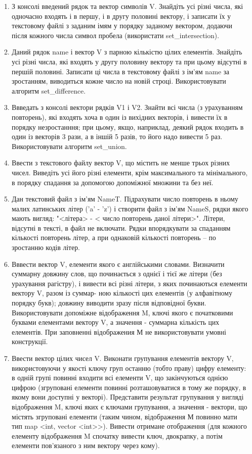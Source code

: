 \documentclass[a5paper,titlepage,openany,twoside,draft]{book_unv}%
\begin{document}
\begin{enumerate}
\item
З консолі введений рядок та вектор символів V. 
Знайдіть усі різні числа, які одночасно входять
і в першу, і в другу половині вектору, і записати їх 
у текстовому файлі з заданим імям у порядку заданому вектором, додаючи
після кожного числа символ пробела (використати set\_intersection).
\item
Даний рядок name і вектор V з парною кількістю цілих елементів.
 Знайдіть усі різні числа, які входять у другу половину
вектору та при цьому відсутні в першій половині. Записати 
ці числа в текстовому файлі з ім'ям name за зростанням,
виводиться кожне число на новій строці. Використовувати алгоритм set\_difference.
\item
Ввведать з консолі вектори рядків V1 і V2. Знайти всі числа (з урахуванням повторень),
 які входять хоча в один із вихідних векторів, і вивести їх
в порядку незростанння; при цьому, якщо, наприклад, деякий рядок
входить в один із векторів 3 рази, а в іншій 5 разів, то його надо вивести 5 раз.
Використовувати алгоритм set\_union.
\item
Ввести з текстового файлу вектор V, що містить не менше трьох різних чисел.
Виведіть усі його різні елементи, крім максимального та мінімального, 
в порядку спадання за допомогою допоміжної множини та без неї.
\item
  Дан текстовий файл з ім'ям NameT. Підрахувати число повторень в ньому
  малих латинських літер ('a' - 'z') і створити файл з ім'ям NameS,
  рядки якого мають вигляд: "\textless{}літера\textgreater{} -
  \textless{} число повторень даної літери\textgreater{}". Літери,
  відсутні в тексті, в файл не включати. Рядки впорядкувати за спаданням
  кількості повторень літер, а при однаковій кількості повторень -- по
  зростанню кодів літер.

\item
Вввести вектор V, елементи якого є англійськими словами. Визначити суммарну довжину
слов, що починається з однієї і тієї же літери (без урахування рагістру),
 і вивести всі різні літери, з яких починаються елементи вектору V, разом із суммар-
ною кількості цих елементів (у алфавітному порядку букв); довжину виводити зразу 
після відповідної букви. Використовувати допоміжне відображення M, ключі якого є початковими буквами
 елементами вектору V, а значення - суммарна кількість цих елементів. 
При заповненні відображения М не використовувати умовні конструкції.

\item
Ввести вектор цілих чисел V. Виконати групування елементів вектору V,
 використовуючи у якості ключу груп останню (тобто праву) 
цифру елементу: в одній групі повинні входити всі елементи V,
що закінчуються однією цифрою (згруповані 
елементи повинні розташовуватися в тому же порядку, в якому вони
доступні у векторі). Представити результат групування у вигляді відображення M, 
ключі яких є ключами групування, а значення - вектори, що містять згруповані
елементи (таким чином, відображення М повинно мати тип
map <int, vector <int>>). Вивести отримане отображення (для кожного
елементу відображення M спочатку вивести ключ, двокрапку, а потім елементи
пов'язаного з ним вектору через кому).


\end{enumerate}
\end{document}
